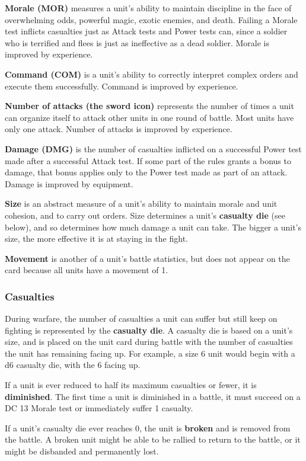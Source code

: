 \documentclass[10pt,a4paper,twoside,bg=print,twocolumn,openany,nodeprecatedcode]{dndbook}
\begin{document}
\textbf{Morale (MOR)} measures a unit's ability to maintain discipline in the face of overwhelming odds, powerful magic, exotic enemies, and death. Failing a Morale test inflicts casualties just as Attack tests and Power tests can, since a soldier who is terrified and flees is just as ineffective as a dead soldier. Morale is improved by experience.

\textbf{Command (COM)} is a unit's ability to correctly interpret complex orders and execute them successfully. Command is improved by experience.

\textbf{Number of attacks (the sword icon)} represents the number of times a unit can organize itself to attack other units in one round of battle. Most units have only one attack. Number of attacks is improved by experience.

\textbf{Damage (DMG)} is the number of casualties inflicted on a successful Power test made after a successful Attack test. If some part of the rules grants a bonus to damage, that bonus applies only to the Power test made as part of an attack. Damage is improved by equipment.

\textbf{Size} is an abstract measure of a unit's ability to maintain morale and unit cohesion, and to carry out orders. Size determines a unit's \textbf{casualty die} (see below), and so determines how much damage a unit can take. The bigger a unit's size, the more effective it is at staying in the fight.

\textbf{Movement} is another of a unit's battle statistics, but does not appear on the card because all units have a movement of 1.

\subsubsection{Casualties}
During warfare, the number of casualties a unit can suffer but still keep on fighting is represented by the \textbf{casualty die}. A casualty die is based on a unit's size, and is placed on the unit card during battle with the number of casualties the unit has remaining facing up. For example, a size 6 unit would begin with a d6 casualty die, with the 6 facing up.

If a unit is ever reduced to half its maximum casualties or fewer, it is \textbf{diminished}. The first time a unit is diminished in a battle, it must succeed on a DC 13 Morale test or immediately suffer 1 casualty.

If a unit's casualty die ever reaches 0, the unit is \textbf{broken} and is removed from the battle. A broken unit might be able to be rallied to return to the battle, or it might be disbanded and permanently lost.
\end{document}
